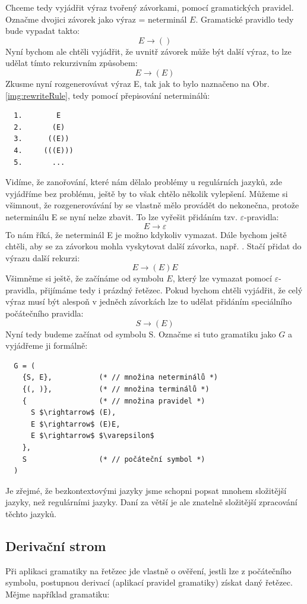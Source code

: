 Chceme tedy vyjádřit výraz tvořený závorkami, pomocí gramatických pravidel.
Označme dvojici závorek jako výraz = neterminál $E$. Gramatické pravidlo tedy bude
vypadat takto:
\[E \rightarrow ()\]
Nyní bychom ale chtěli vyjádřit, že uvnitř závorek může být další výraz, to
lze udělat tímto rekurzivním způsobem:
\[E \rightarrow (E)\]
Zkusme nyní rozgenerovávat výraz E, tak jak to bylo naznačeno na Obr. \ref{img:rewriteRule},
tedy pomocí přepisování neterminálů:
\begin{lstlisting}
  1.        E
  2.       (E)
  3.      ((E))
  4.     (((E)))
  5.       ...
\end{lstlisting}
Vidíme, že zanořování, které nám dělalo problémy u regulárních jazyků, zde vyjádříme bez problému,
ještě by to však chtělo několik vylepšení.
Můžeme si všimnout, že rozgenerovávání by se vlastně mělo provádět do nekonečna,
protože neterminálu E se nyní nelze zbavit. To lze vyřešit přidáním tzv.
$\varepsilon$-pravidla:
\[E \rightarrow \varepsilon\]
To nám říká, že neterminál E je možno kdykoliv vymazat. Dále bychom ještě chtěli,
aby se za závorkou mohla vyskytovat další závorka, např. \symb{(()())}.
Stačí přidat do výrazu další rekurzi:
\[E \rightarrow (E)E\]
Všimněme si ještě, že začínáme od symbolu $E$, který lze vymazat pomocí
$\varepsilon$-pravidla, přijímáme tedy i prázdný řetězec. Pokud bychom chtěli
vyjádřit, že celý výraz musí být alespoň v jedněch závorkách lze to udělat
přidáním speciálního počátečního pravidla:
\[S \rightarrow (E)\]
Nyní tedy budeme začínat od symbolu S. Označme si tuto gramatiku jako
$G$ a vyjádřeme ji formálně:

\begin{lstlisting}
  G = (
    {S, E},           (* // množina neterminálů *)
    {(, )},           (* // množina terminálů *)
    {                 (* // množina pravidel *)
      S $\rightarrow$ (E),
      E $\rightarrow$ (E)E,
      E $\rightarrow$ $\varepsilon$
    },
    S                 (* // počáteční symbol *)
  )
\end{lstlisting}

Je zřejmé, že bezkontextovými jazyky jsme schopni popsat mnohem
složitější jazyky, než regulárními jazyky. Daní za větší 
je ale znatelně složitější zpracování těchto jazyků.

\subsection{Derivační strom}
\label{subsec:derivationTree}
Při aplikaci gramatiky na řetězec jde vlastně o ověření,
jestli lze z počátečního symbolu,
postupnou derivací (aplikací pravidel gramatiky) získat daný řetězec.
Mějme například gramatiku:

